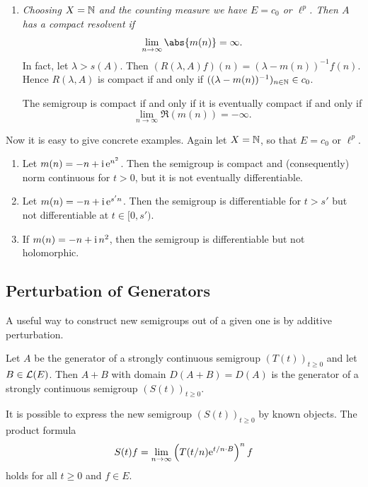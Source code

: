 \begin{example}
\begin{enumerate}[\upshape (i), wide, labelindent=.25em]
%
\[
	S(\theta + \pi/2) \subseteq \rho(A) .
\]
%
\begin{proof}
The condition is necessary by Theorem~\ref{thm:a2-1.12}.
Conversely, if\/ $S(\theta + \pi/2) \subseteq \rho(A)$, then one verifies directly that 
\[
(T(z)f)(x) = \eu^{z \cdot m(x)}f(x) \quad (f \in E, x \in X) 
\]
defines a family $(T(z))_{z \in S(\theta)}$ of bounded operators satisfying conditions (i) and (ii)
of Definition~\ref{def:a2-1.11}.
\end{proof}
\item \label{ex:a2-1.28-4}
\textit{Choosing $X = \mathbb{N}$ and the counting measure we have $E = c_{0}$ or $\ell^{p}$.
Then $A$ has a compact resolvent if }
%
\[
	\lim_{n \to \infty} \abs{m(n)} = \infty .
\]
%
In fact, let $\lambda > s(A)$.
Then $(R(\lambda,A)f)(n) = (\lambda-m(n))^{-1}f(n)$.
Hence $R(\lambda,A)$ is compact if and only if\/ $((\lambda-m(n))^{-1})_{n \in \mathbb{N}} \in c_{0}$. 

The semigroup is compact if and only if it is eventually compact if and only if 
\[
\lim_{n \to \infty} \Re(m(n)) = -\infty.
\]
\end{enumerate}
Now it is easy to give concrete examples. 
Again let $X = \mathbb{N}$, so that $E = c_{0}$ or $\ell^{p}$.
\begin{enumerate}[\upshape(i)]%

\item
Let $m(n) = -n + \mathrm{i}\,\mathrm{e}^{n^{2}}$.
Then the semigroup is compact and (consequently) norm continuous for $t > 0$, but it is not eventually differentiable.

\item
Let $m(n) = -n + \mathrm{i}\,\mathrm{e}^{s'n}$.
Then the semigroup is differentiable for $t > s'$ but not differentiable at $t \in [0,s')$.

\item
If\/ $m(n) = -n + \mathrm{i}\, n^{2}$, then the semigroup is differentiable but not holomorphic.

\end{enumerate}
\end{example}	

\subsection{Perturbation of Generators} \label{subsec:a2-1.se8}
A useful way to construct new semigroups out of a given one is by additive perturbation.%
\begin{theorem}\label{thm:a2-1.29}
Let $A$ be the generator of a strongly continuous semigroup $(T(t))_{t \geq 0}$ and let $B \in \mathcal{L}(E)$.
Then $A + B$ with domain $D(A+B) = D(A)$ is the generator of a strongly continuous semigroup $(S(t))_{t \geq 0}$.
\end{theorem}
It is possible to express the new semigroup $(S(t))_{t \geq 0}$ by known objects.
The product formula
\begin{equation}\label{eq:a2-1.8}
    S(t)f = \lim_{n \to \infty} \left( T(t/n)\mathrm{e}^{t/n \cdot B} \right)^{n} f
\end{equation}
holds for all $t \geq 0$ and $f \in E$.

